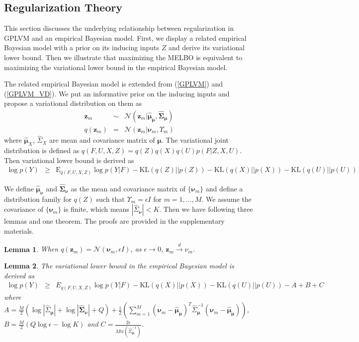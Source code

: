 \documentclass{article}
\newtheorem{lemma}{Lemma}
\begin{document}
\subsection{Regularization Theory} \label{sec:rt}
This section discusses the underlying relationship between regularization in GPLVM and an empirical Bayesian model. First, we display a related empirical Bayesian model with a prior on its inducing inputs $Z$ and derive its variational lower bound. Then we illustrate that maximizing the MELBO is equivalent to maximizing the variational lower bound in the empirical Bayesian model.

The related empirical Bayesian model is extended from (\ref{GPLVM}) and (\ref{GPLVM_VD}). We put an informative prior on the inducing inputs and propose a variational distribution on them as 
\begin{eqnarray}
\bm z_m & \sim & \mathcal{N}(\bm z_m| \hat{\bm \mu}_{\bm\mu}, \hat{\bm\Sigma}_{\bm\mu}) \nonumber \\
q(\bm z_m) & = & \mathcal{N}(\bm z_m|\bm \nu_m, \Upsilon_m) \nonumber
\end{eqnarray}
where $\hat{\bm \mu}_X$, $\hat{\Sigma}_X$ are mean and covariance matrix of $\bm \mu$. The variational joint distribution is defined as $q(F, U, X, Z) = q(Z)q(X)q(U)p(F|Z, X, U)$. Then variational lower bound is derived as
\begin{eqnarray}
\log p(Y) & \geq & \mathrm{E}_{q(F, U, X, Z)}\log p(Y|F) - \mathrm{KL}(q(Z)||p(Z)) - \mathrm{KL}(q(X)||p(X)) - \mathrm{KL}(q(U)||p(U)) \nonumber
\end{eqnarray}

We define $\hat{\bm \mu}_{\bm\nu}$ and $\hat{\bm\Sigma}_{\bm\nu}$ as the mean and covariance matrix of $\{\bm \nu_m\}$ and define a distribution family for $q(Z)$ such that $\Upsilon_{m} = \epsilon I$ for $m = 1,\ldots, M$. We assume the covariance of $\{\bm \nu_m\}$ is finite, which means $|\hat{\Sigma}_{\bm \nu}| < K$. Then we have following three lemmas and one theorem. The proofs are provided in the supplementary materials.

\begin{lemma}
	When $q(\bm z_m) = \mathcal{N}(\bm \nu_m, \epsilon I)$, as $\epsilon \rightarrow 0$, $\bm z_m \stackrel{d}{\rightarrow} \nu_m$.
\end{lemma}

\begin{lemma}
	The variational lower bound in the empirical Bayesian model is derived as 
	\begin{eqnarray}
	\log p(Y) & \geq & E_{q(F, U, X, Z)}\log p(Y|F) - \mathrm{KL}(q(X)||p(X)) - \mathrm{KL}(q(U)||p(U)) - A + B + C \nonumber
	\end{eqnarray}
	where $A = \frac{M}{2}(\log |\hat{\Sigma}_{\bm \mu}| + \log|\hat{\bm\Sigma}_{\bm\nu}| + Q) + \frac{1}{2}\left(\sum_{m = 1}^M(\bm\nu_m - \hat{\bm \mu}_{\bm \mu})^T\hat{\Sigma}_{\bm\mu}^{-1}(\bm\nu_m - \hat{\bm \mu}_{\bm \mu})\right)$, $B = \frac{M}{2}(Q\log\epsilon-\log K)$ and $C = \frac{2\epsilon}{M\mathrm{tr}(\hat{\Sigma}_{\bm\mu}^{-1})}$.
\end{lemma}
	
\end{document}
